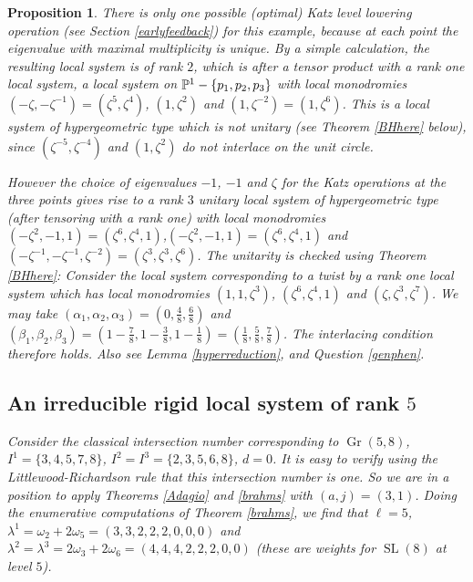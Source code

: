 \documentclass[11pt]{amsart}
\newcommand\op{\operatorname}
\newcommand\Gr{\operatorname{Gr}}
\newtheorem{proposition}[theorem]{Proposition}
\numberwithin{theorem}{subsection}
\begin{document}
{\begin{proposition}

There is only one possible (optimal) Katz level lowering operation (see Section \ref{earlyfeedback}) for this example, because  at each point the eigenvalue with maximal multiplicity is unique. By a simple calculation, the resulting local system is of rank $2$, which is after a tensor product with a rank one local system, a local system on $\Bbb{P}^1-\{p_1,p_2,p_3\}$ with local monodromies $(-\zeta,-\zeta^{-1})=(\zeta^5,\zeta^4)$, $(1,\zeta^2)$ and $(1,\zeta^{-2})=(1,\zeta^6)$. This is a local system of hypergeometric type which is not unitary (see Theorem \ref{BHhere} below), since $(\zeta^{-5},\zeta^{-4})$ and
$(1,\zeta^2)$ do not interlace on the unit circle.

However  the choice of eigenvalues $-1$, $-1$ and $\zeta$ for the Katz operations at the three points gives rise to a rank $3$ unitary local system of hypergeometric type (after tensoring with a rank one)  with local monodromies $(-\zeta^{2},-1,1)=(\zeta^6,\zeta^4,1)$,$(-\zeta^{2},-1,1)=(\zeta^6,\zeta^4,1)$ and $(-\zeta^{-1},-\zeta^{-1},\zeta^{-2})=(\zeta^3,\zeta^3,\zeta^6)$. The unitarity is checked using Theorem \ref{BHhere}: Consider the local system corresponding to a twist by a rank one local system which has local monodromies $(1,1,\zeta^3)$, $(\zeta^6,\zeta^4,1)$ and $(\zeta,\zeta^3,\zeta^7)$. We may take $(\alpha_1,\alpha_2,\alpha_3)=(0,\frac{4}{8},\frac{6}{8})$ and $(\beta_1,\beta_2,\beta_3)=(1-\frac{7}{8},1-\frac{3}{8},1-\frac{1}{8})=(\frac{1}{8},\frac{5}{8},\frac{7}{8})$. The interlacing condition
therefore holds.  Also see Lemma \ref{hyperreduction}, and Question \ref{genphen}.
\iffalse
\subsection{An irreducible rigid local system of rank $5$}\label{E2}
Consider the classical intersection number corresponding to $\Gr(5,8)$, $I^1=\{3,4,5,7,8\}$, $I^2=I^3=\{2,3,5,6,8\}$, $d=0$. It is easy to verify using the Littlewood-Richardson rule that this intersection number is one. So we are in a position to apply Theorems \ref{Adagio} and \ref{brahms} with $(a,j)=(3,1)$. Doing the enumerative computations of
Theorem \ref{brahms}, we find that $\ell=5$, $\lambda^1=\omega_2+2\omega_5 =(3,3,2,2,2,0,0,0)$ and $\lambda^2=\lambda^3=
2\omega_3+2\omega_6 =(4,4,4,2,2,2,0,0) $ (these are weights for $\op{SL}(8)$ at level $5$).


\end{proposition}}
\end{document}

